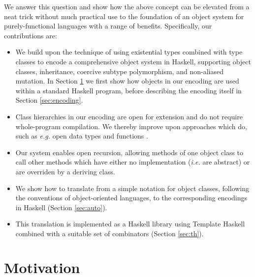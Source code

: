 \documentclass[authoryear,preprint]{sigplanconf}
\begin{document}
We answer this question and show how the above concept can be elevated from a neat trick without much practical use to the foundation of an object system for purely-functional languages with a range of benefits. Specifically, our contributions are:
\begin{itemize}
    \item We build upon the technique of using existential types combined with type classes to encode a comprehensive object system in Haskell, supporting object classes, inheritance, coercive subtype polymorphism, and non-aliased mutation. In Section \ref{sec:usage} we first show how objects in our encoding are used within a standard Haskell program, before describing the encoding itself in Section \ref{sec:encoding}.
    \item Class hierarchies in our encoding are open for extension and do not require whole-program compilation. We thereby improve upon approaches which do, such as \emph{e.g.} open data types and functions \cite{loh2006open}.
    \item Our system enables open recursion, allowing methods of one object class to call other methods which have either no implementation (\emph{i.e.} are abstract) or are overriden by a deriving class.
    \item We show how to translate from a simple notation for object classes, following the conventions of object-oriented languages, to the corresponding encodings in Haskell (Section \ref{sec:auto}).
    \item This translation is implemented as a Haskell library using Template Haskell combined with a suitable set of combinators (Section \ref{sec:th}).
\end{itemize}

\section{Motivation}
\label{sec:usage}
\end{document}
